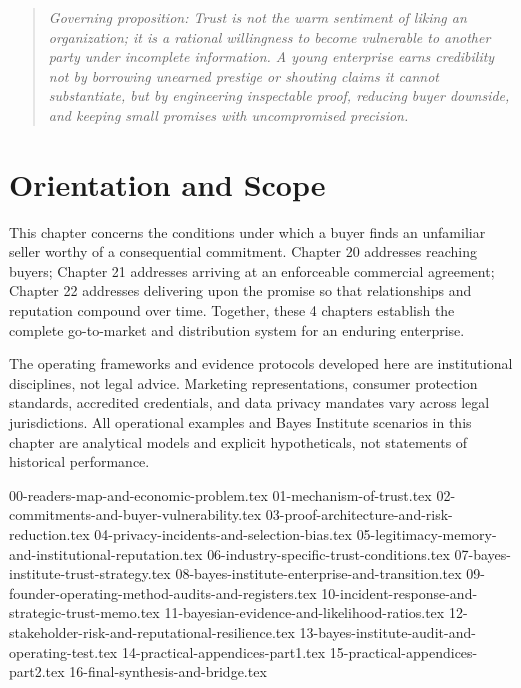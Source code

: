 
\begin{quote}
\textit{Governing proposition: Trust is not the warm sentiment of liking an organization; it is a rational willingness to become vulnerable to another party under incomplete information. A young enterprise earns credibility not by borrowing unearned prestige or shouting claims it cannot substantiate, but by engineering inspectable proof, reducing buyer downside, and keeping small promises with uncompromised precision.}
\end{quote}

\vspace{1.5pt}

\section*{Orientation and Scope}

This chapter concerns the conditions under which a buyer finds an unfamiliar seller worthy of a consequential commitment. Chapter 20 addresses reaching buyers; Chapter 21 addresses arriving at an enforceable commercial agreement; Chapter 22 addresses delivering upon the promise so that relationships and reputation compound over time. Together, these 4 chapters establish the complete go-to-market and distribution system for an enduring enterprise.

The operating frameworks and evidence protocols developed here are institutional disciplines, not legal advice. Marketing representations, consumer protection standards, accredited credentials, and data privacy mandates vary across legal jurisdictions. All operational examples and Bayes Institute scenarios in this chapter are analytical models and explicit hypotheticals, not statements of historical performance.

{00-readers-map-and-economic-problem.tex}
{01-mechanism-of-trust.tex}
{02-commitments-and-buyer-vulnerability.tex}
{03-proof-architecture-and-risk-reduction.tex}
{04-privacy-incidents-and-selection-bias.tex}
{05-legitimacy-memory-and-institutional-reputation.tex}
{06-industry-specific-trust-conditions.tex}
{07-bayes-institute-trust-strategy.tex}
{08-bayes-institute-enterprise-and-transition.tex}
{09-founder-operating-method-audits-and-registers.tex}
{10-incident-response-and-strategic-trust-memo.tex}
{11-bayesian-evidence-and-likelihood-ratios.tex}
{12-stakeholder-risk-and-reputational-resilience.tex}
{13-bayes-institute-audit-and-operating-test.tex}
{14-practical-appendices-part1.tex}
{15-practical-appendices-part2.tex}
{16-final-synthesis-and-bridge.tex}

